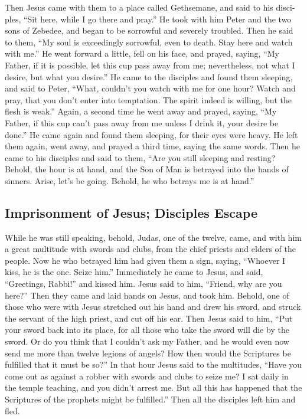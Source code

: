 \begin{paracol}{2}
\begin{otherlanguage}{english}
 Then Jesus came with them to a place called Gethsemane,
and said to his disciples, ``Sit here, while I go there and pray.''
 He took with him Peter and the two sons of Zebedee, and
began to be sorrowful and severely troubled.  Then he
said to them, ``My soul is exceedingly sorrowful, even to death. Stay
here and watch with me.''  He went forward a little, fell
on his face, and prayed, saying, ``My Father, if it is possible, let
this cup pass away from me; nevertheless, not what I desire, but what
you desire.''  He came to the disciples and found them
sleeping, and said to Peter, ``What, couldn't you watch with me for one
hour?  Watch and pray, that you don't enter into
temptation. The spirit indeed is willing, but the flesh is weak.''
 Again, a second time he went away and prayed, saying,
``My Father, if this cup can't pass away from me unless I drink it, your
desire be done.''  He came again and found them sleeping,
for their eyes were heavy.  He left them again, went
away, and prayed a third time, saying the same words. 
Then he came to his disciples and said to them, ``Are you still sleeping
and resting? Behold, the hour is at hand, and the Son of Man is betrayed
into the hands of sinners.  Arise, let's be going.
Behold, he who betrays me is at hand.''

\hypertarget{imprisonment-of-jesus-disciples-escape}{%
\subsection{Imprisonment of Jesus; Disciples
Escape}\label{imprisonment-of-jesus-disciples-escape}}

 While he was still speaking, behold, Judas, one of the
twelve, came, and with him a great multitude with swords and clubs, from
the chief priests and elders of the people.  Now he who
betrayed him had given them a sign, saying, ``Whoever I kiss, he is the
one. Seize him.''  Immediately he came to Jesus, and
said, ``Greetings, Rabbi!'' and kissed him.  Jesus said
to him, ``Friend, why are you here?'' Then they came and laid hands on
Jesus, and took him.  Behold, one of those who were with
Jesus stretched out his hand and drew his sword, and struck the servant
of the high priest, and cut off his ear.  Then Jesus said
to him, ``Put your sword back into its place, for all those who take the
sword will die by the sword.  Or do you think that I
couldn't ask my Father, and he would even now send me more than twelve
legions of angels?  How then would the Scriptures be
fulfilled that it must be so?''  In that hour Jesus said
to the multitudes, ``Have you come out as against a robber with swords
and clubs to seize me? I sat daily in the temple teaching, and you
didn't arrest me.  But all this has happened that the
Scriptures of the prophets might be fulfilled.'' Then all the disciples
left him and fled.


\end{otherlanguage}
\end{paracol}
